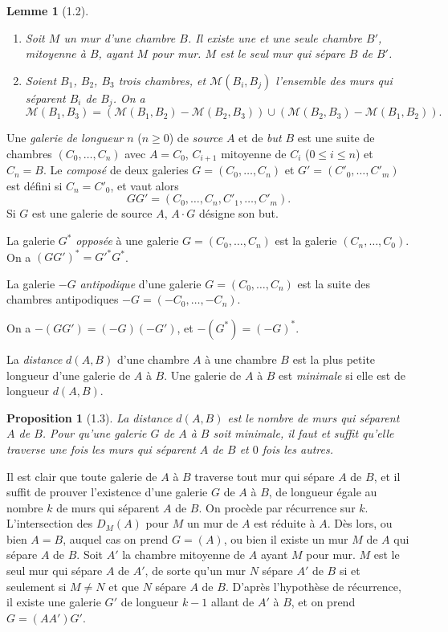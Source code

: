 \documentclass[12pt]{article}
\newtheorem{proposition}[theoreme]{Proposition}
\newtheorem{lemme}[theoreme]{Lemme}
\theoremstyle{remark}
\begin{document}
\begin{lemme}[1.2]
\begin{enumerate}
\item[(i)] Soit $M$ un mur d'une chambre $B$. Il existe une et une seule chambre $B'$, mitoyenne à $B$, ayant $M$ pour mur. $M$ est le seul mur qui sépare $B$ de $B'$.
\item[(ii)] Soient $B_1$, $B_2$, $B_3$ trois chambres, et $\mathcal{M}(B_i, B_j)$ l'ensemble des murs qui séparent $B_i$ de $B_j$. On a
\[\mathcal{M}(B_1, B_3) = (\mathcal{M}(B_1, B_2) - \mathcal{M}(B_2, B_3)) \cup (\mathcal{M}(B_2, B_3) - \mathcal{M}(B_1, B_2)).\]
\end{enumerate}
\end{lemme}

Une \emph{galerie de longueur} $n$ ($n \geq 0$) de \emph{source} $A$ et de \emph{but} $B$ est une suite de chambres $(C_0, \ldots, C_n)$ avec $A = C_0$, $C_{i+1}$ mitoyenne de $C_i$ ($0 \leq i \leq n$) et $C_n = B$. Le \emph{composé} de deux galeries $G = (C_0, \ldots, C_n)$ et $G' = (C'_0, \ldots, C'_m)$ est défini si $C_n = C'_0$, et vaut alors
\[GG' = (C_0, \ldots, C_n, C'_1, \ldots, C'_m).\]
Si $G$ est une galerie de source $A$, $A \cdot G$ désigne son but.

La galerie $G^*$ \emph{opposée} à une galerie $G = (C_0, \ldots, C_n)$ est la galerie $(C_n, \ldots, C_0)$. On a $(GG')^* = G'^* G^*$.

La galerie $-G$ \emph{antipodique} d'une galerie $G = (C_0, \ldots, C_n)$ est la suite des chambres antipodiques $-G = (-C_0, \ldots, -C_n)$.

On a $-(GG') = (-G)(-G')$, et $-(G^*) = (-G)^*$.

La \emph{distance} $d(A, B)$ d'une chambre $A$ à une chambre $B$ est la plus petite longueur d'une galerie de $A$ à $B$. Une galerie de $A$ à $B$ est \emph{minimale} si elle est de longueur $d(A, B)$.

\begin{proposition}[1.3]
La distance $d(A, B)$ est le nombre de murs qui séparent $A$ de $B$. Pour qu'une galerie $G$ de $A$ à $B$ soit minimale, il faut et suffit qu'elle traverse une fois les murs qui séparent $A$ de $B$ et $0$ fois les autres.
\end{proposition}

Il est clair que toute galerie de $A$ à $B$ traverse tout mur qui sépare $A$ de $B$, et il suffit de prouver l'existence d'une galerie $G$ de $A$ à $B$, de longueur égale au nombre $k$ de murs qui séparent $A$ de $B$. On procède par récurrence sur $k$. L'intersection des $D_M(A)$ pour $M$ un mur de $A$ est réduite à $A$. Dès lors, ou bien $A = B$, auquel cas on prend $G = (A)$, ou bien il existe un mur $M$ de $A$ qui sépare $A$ de $B$. Soit $A'$ la chambre mitoyenne de $A$ ayant $M$ pour mur. $M$ est le seul mur qui sépare $A$ de $A'$, de sorte qu'un mur $N$ sépare $A'$ de $B$ si et seulement si $M \neq N$ et que $N$ sépare $A$ de $B$. D'après l'hypothèse de récurrence, il existe une galerie $G'$ de longueur $k-1$ allant de $A'$ à $B$, et on prend $G = (A A') G'$.
\end{document}
